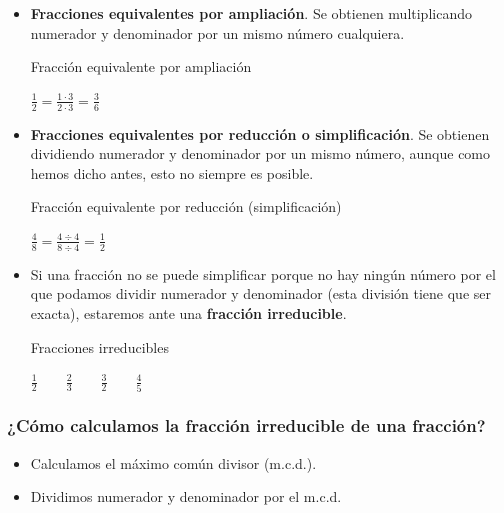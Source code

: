 \begin{itemize}
    \item \textbf{Fracciones equivalentes por ampliación}. Se obtienen multiplicando numerador y denominador por un mismo número cualquiera.

    \begin{ejemplos}[label={Ejemplo:ampliacion}]{Fracción equivalente por ampliación}
        \begin{center}
            $\displaystyle \frac{1}{2} = \frac{1 \cdot 3}{2 \cdot 3} = \frac{3}{6}$
        \end{center}
    \end{ejemplos}

    \item \textbf{Fracciones equivalentes por reducción o simplificación}. Se obtienen dividiendo numerador y denominador por un mismo número, aunque como hemos dicho antes, esto no siempre es posible.

    \begin{ejemplos}[label={Ejemplo:reduccion}]{Fracción equivalente por reducción (simplificación)}
        \begin{center}
            $\displaystyle \frac{4}{8} = \frac{4 \div 4}{8 \div 4} = \frac{1}{2}$
        \end{center}
    \end{ejemplos}

    \item Si una fracción no se puede simplificar porque no hay ningún número por el que podamos dividir numerador y denominador (esta división tiene que ser exacta), estaremos ante una \textbf{fracción irreducible}.

    \begin{ejemplos}[label={Ejemplo:irreducible}]{Fracciones irreducibles}
        \begin{center}
            $\displaystyle \frac{1}{2} \qquad \frac{2}{3} \qquad \frac{3}{2} \qquad \frac{4}{5}$
        \end{center}
    \end{ejemplos}
\end{itemize}

\subsubsection{¿Cómo calculamos la fracción irreducible de una fracción?}

\begin{itemize}
    \item Calculamos el máximo común divisor (m.c.d.).
    \item Dividimos numerador y denominador por el m.c.d.
\end{itemize}

